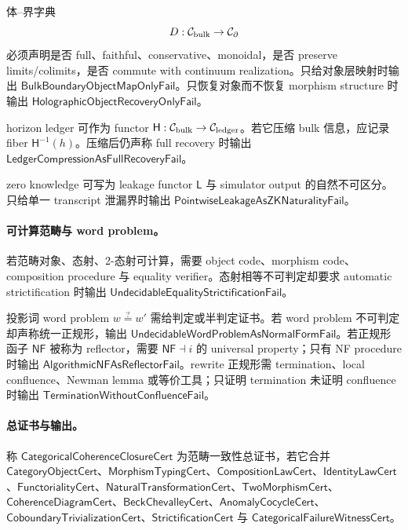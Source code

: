 体--界字典
\[
D:\mathcal C_{\rm bulk}\to\mathcal C_{\partial}
\]
必须声明是否 full、faithful、conservative、monoidal，是否 preserve limits/colimits，是否 commute with continuum realization。只给对象层映射时输出 \(\mathsf{BulkBoundaryObjectMapOnlyFail}\)。只恢复对象而不恢复 morphism structure 时输出 \(\mathsf{HolographicObjectRecoveryOnlyFail}\)。

horizon ledger 可作为 functor \(\mathsf H:\mathcal C_{\rm bulk}\to\mathcal C_{\rm ledger}\)。若它压缩 bulk 信息，应记录 fiber \(\mathsf H^{-1}(h)\)。压缩后仍声称 full recovery 时输出 \(\mathsf{LedgerCompressionAsFullRecoveryFail}\)。

zero knowledge 可写为 leakage functor \(\mathsf L\) 与 simulator output 的自然不可区分。只给单一 transcript 泄漏界时输出 \(\mathsf{PointwiseLeakageAsZKNaturalityFail}\)。

\paragraph{可计算范畴与 word problem。}
若范畴对象、态射、2-态射可计算，需要 object code、morphism code、composition procedure 与 equality verifier。态射相等不可判定却要求 automatic strictification 时输出 \(\mathsf{UndecidableEqualityStrictificationFail}\)。

投影词 word problem \(w\stackrel{?}=w'\) 需给判定或半判定证书。若 word problem 不可判定却声称统一正规形，输出 \(\mathsf{UndecidableWordProblemAsNormalFormFail}\)。若正规形函子 \(\mathsf{NF}\) 被称为 reflector，需要 \(\mathsf{NF}\dashv i\) 的 universal property；只有 NF procedure 时输出 \(\mathsf{AlgorithmicNFAsReflectorFail}\)。rewrite 正规形需 termination、local confluence、Newman lemma 或等价工具；只证明 termination 未证明 confluence 时输出 \(\mathsf{TerminationWithoutConfluenceFail}\)。

\paragraph{总证书与输出。}
称 \(\mathsf{CategoricalCoherenceClosureCert}\) 为范畴一致性总证书，若它合并 \(\mathsf{CategoryObjectCert}\)、\(\mathsf{MorphismTypingCert}\)、\(\mathsf{CompositionLawCert}\)、\(\mathsf{IdentityLawCert}\)、\(\mathsf{FunctorialityCert}\)、\(\mathsf{NaturalTransformationCert}\)、\(\mathsf{TwoMorphismCert}\)、\(\mathsf{CoherenceDiagramCert}\)、\(\mathsf{BeckChevalleyCert}\)、\(\mathsf{AnomalyCocycleCert}\)、\(\mathsf{CoboundaryTrivializationCert}\)、\(\mathsf{StrictificationCert}\) 与 \(\mathsf{CategoricalFailureWitnessCert}\)。

